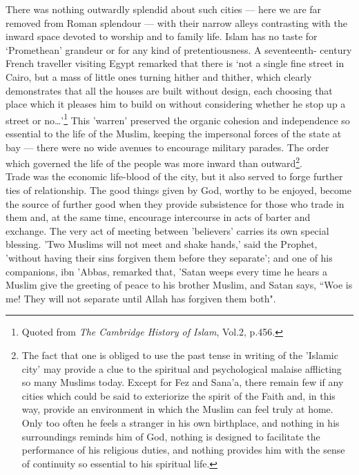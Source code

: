 \documentclass[10pt, twoside]{book}
\begin{document}
There was nothing outwardly splendid about such cities --- here we are far removed from Roman splendour --- with their narrow alleys contrasting with the inward space devoted to worship and to family life. 
Islam has no taste for `Promethean' grandeur or for any kind of pretentiousness. A seventeenth-
century French traveller visiting Egypt remarked that there is `not a single fine street in Cairo, 
but a mass of little ones turning hither and thither, which clearly demonstrates that all the houses 
are built without design, each choosing that place which it pleases him to build on without 
considering whether he stop up a street or no\ldots{}'\footnote{Quoted from \emph{The Cambridge History of Islam}, Vol.2, p.456.} This 'warren' preserved the organic cohesion 
and independence so essential to the life of the Muslim, keeping the impersonal forces of the state 
at bay --- there were no wide avenues to encourage military parades. The order which governed the life 
of the people was more inward than outward\footnote{The fact that one is obliged to use the past tense in writing of the 'Islamic city' may provide a clue to the spiritual and psychological malaise afflicting so many Muslims today. Except for Fez and Sana'a, there remain few if any cities which could be said to exteriorize the spirit of the Faith and, in this way, provide an environment in which the Muslim can feel truly at home. Only too often he feels a stranger in his own birthplace, and nothing in his surroundings reminds him of God, nothing is designed to facilitate the performance of his religious duties, and nothing provides him with the sense of continuity so essential to his spiritual life.}.\\

Trade was the economic life\hyp{}blood of the city, but it also served to forge further ties of 
relationship. The good things given by God, worthy to be enjoyed, become the source of further good 
when they provide subsistence for those who trade in them and, at the same time, encourage 
intercourse in acts of barter and exchange. The very act of meeting between 'believers' carries its 
own special blessing. 'Two Muslims will not meet and shake hands,' said the Prophet, 'without having 
their sins forgiven them before they separate'; and one of his companions, ibn 'Abbas, remarked that, 
'Satan weeps every time he hears a Muslim give the greeting of peace to his brother Muslim, and Satan 
says, ``Woe is me! They will not separate until Allah has forgiven them both". \\
\end{document}
